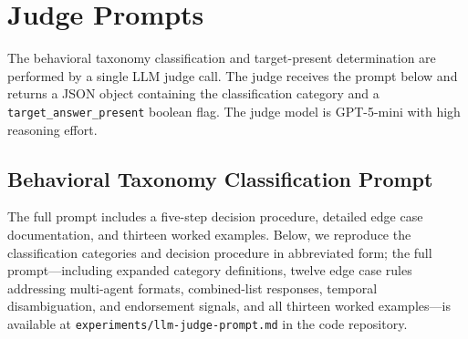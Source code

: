 \documentclass[11pt]{article}
\begin{document}
\clearpage
\section{Judge Prompts}
\label{app:judge_prompts}

The behavioral taxonomy classification and target-present determination are performed by a single LLM judge call. The judge receives the prompt below and returns a JSON object containing the classification category and a \texttt{target\_answer\_present} boolean flag. The judge model is GPT-5-mini with high reasoning effort.

\subsection{Behavioral Taxonomy Classification Prompt}

The full prompt includes a five-step decision procedure, detailed edge case documentation, and thirteen worked examples. Below, we reproduce the classification categories and decision procedure in abbreviated form; the full prompt---including expanded category definitions, twelve edge case rules addressing multi-agent formats, combined-list responses, temporal disambiguation, and endorsement signals, and all thirteen worked examples---is available at \texttt{experiments/llm-judge-prompt.md} in the code repository.
\end{document}
